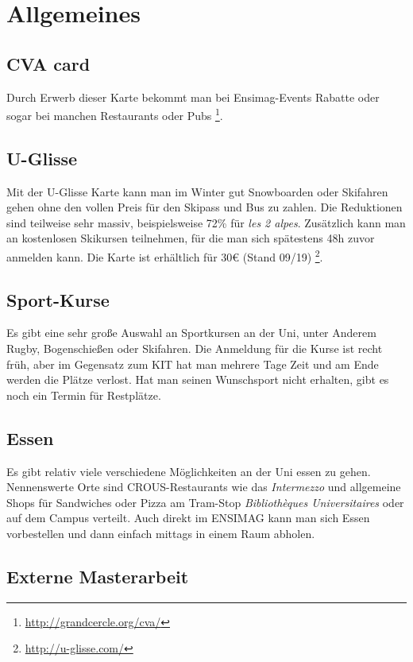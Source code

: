 \documentclass[11pt,a4paper]{article}
\begin{document}
  \section{Allgemeines}
  \subsection{CVA card}
  Durch Erwerb dieser Karte bekommt man bei Ensimag-Events Rabatte oder sogar bei manchen Restaurants oder Pubs \footnote{\url{http://grandcercle.org/cva/}}.

  \subsection{U-Glisse}
  Mit der U-Glisse Karte kann man im Winter gut Snowboarden oder Skifahren gehen ohne den vollen Preis für den Skipass und Bus zu zahlen. Die Reduktionen sind teilweise sehr massiv, beispielsweise 72\% für \textit{les 2 alpes}. Zusätzlich kann man an kostenlosen Skikursen teilnehmen, für die man sich spätestens 48h zuvor anmelden kann.
  Die Karte ist erhältlich für 30€ (Stand 09/19) \footnote{\url{http://u-glisse.com/}}.
  \subsection{Sport-Kurse}
  Es gibt eine sehr große Auswahl an Sportkursen an der Uni, unter Anderem Rugby, Bogenschießen oder Skifahren. Die Anmeldung für die Kurse ist recht früh, aber im Gegensatz zum KIT hat man mehrere Tage Zeit und am Ende werden die Plätze verlost. Hat man seinen Wunschsport nicht erhalten, gibt es noch ein Termin für Restplätze.

  \subsection{Essen}
  Es gibt relativ viele verschiedene Möglichkeiten an der Uni essen zu gehen. Nennenswerte Orte sind CROUS-Restaurants wie das \textit{Intermezzo} und allgemeine Shops für Sandwiches oder Pizza am Tram-Stop \textit{Bibliothèques Universitaires} oder auf dem Campus verteilt. Auch direkt im ENSIMAG kann man sich Essen vorbestellen und dann einfach mittags in einem Raum abholen.

  \subsection{Externe Masterarbeit}
\end{document}
